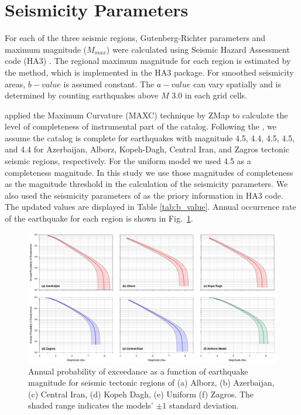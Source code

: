 
\section{Seismicity Parameters}

For each of the three seismic regions, Gutenberg-Richter parameters and maximum magnitude ($M_{max}$) were calculated using Seismic Hazard Assessment code (HA3) \citep{kijko2004}. The regional maximum magnitude for each region is estimated by the \citet{Kijko1989} method, which is implemented in the HA3 package. For smoothed seismicity areas, $b-value$ is assumed constant. The $a-value$ can vary spatially and is determined by counting earthquakes above $M$ 3.0 in each grid cells.

\citet{Karimiparidari2013} applied the Maximum Curvature (MAXC) technique \citep{Wyss1999, Wiemer2000} by ZMap \citep{Wiemer2001} to calculate the level of completeness of instrumental part of the catalog.  Following the \citet{Karimiparidari2013}, we assume the catalog is complete for earthquakes with magnitude 4.5, 4.4, 4.5, 4.5, and 4.4 for Azerbaijan, Alborz,  Kopeh-Dagh, Central Iran, and Zagros tectonic seismic regions, respectively. For the uniform model we used 4.5 as a completeness magnitude. In this study we use those magnitudes of completeness as the magnitude threshold in the calculation of the seismicity parameters. We also used the seismicity parameters of \citet{Karimiparidari2013} as the priory information in HA3 code. The updated values are displayed in Table \ref{tab:b_value}.  Annual occurrence rate of the earthquake for each region is shown in Fig.~\ref{fig:annual_m}.

\begin{figure}[t]
    \centering
    \includegraphics[width=\textwidth]{figures/pdf/figure-04} 
    \caption{Annual probability of exceedance as a function of earthquake magnitude for seismic tectonic regions of (a) Alborz, (b) Azerbaijan, (c) Central Iran, (d) Kopeh Dagh, (e) Uniform (f) Zagros. The shaded range indicates the models' $\pm 1$ standard deviation.}
    \label{fig:annual_m}
\end{figure}

